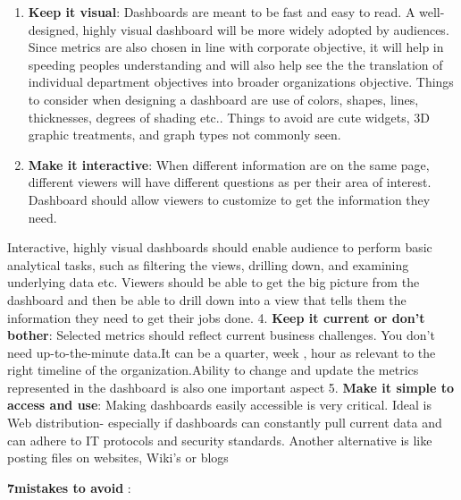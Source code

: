 \documentclass[]{book}
\theoremstyle{definition}
\theoremstyle{definition}
\theoremstyle{definition}
\theoremstyle{remark}
\begin{document}
\begin{enumerate}
\def\labelenumi{\arabic{enumi}.}
\setcounter{enumi}{1}
\item
  \textbf{Keep it visual}: Dashboards are meant to be fast and easy to
  read. A well-designed, highly visual dashboard will be more widely
  adopted by audiences. Since metrics are also chosen in line with
  corporate objective, it will help in speeding peoples understanding
  and will also help see the the translation of individual department
  objectives into broader organizations objective. Things to consider
  when designing a dashboard are use of colors, shapes, lines,
  thicknesses, degrees of shading etc.. Things to avoid are cute
  widgets, 3D graphic treatments, and graph types not commonly seen.
\item
  \textbf{Make it interactive}: When different information are on the
  same page, different viewers will have different questions as per
  their area of interest. Dashboard should allow viewers to customize to
  get the information they need.
\end{enumerate}

Interactive, highly visual dashboards should enable audience to perform
basic analytical tasks, such as filtering the views, drilling down, and
examining underlying data etc. Viewers should be able to get the big
picture from the dashboard and then be able to drill down into a view
that tells them the information they need to get their jobs done. 4.
\textbf{Keep it current or don't bother}: Selected metrics should
reflect current business challenges. You don't need up-to-the-minute
data.It can be a quarter, week , hour as relevant to the right timeline
of the organization.Ability to change and update the metrics represented
in the dashboard is also one important aspect 5. \textbf{Make it simple
to access and use}: Making dashboards easily accessible is very
critical. Ideal is Web distribution- especially if dashboards can
constantly pull current data and can adhere to IT protocols and security
standards. Another alternative is like posting files on websites, Wiki's
or blogs

\textbf{7mistakes to avoid} :
\end{document}
